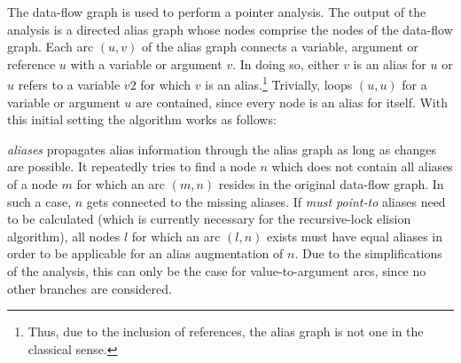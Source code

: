 The data-flow graph is used to perform a pointer analysis. The output of the analysis is a directed alias graph whose nodes comprise the nodes of the data-flow graph. Each arc $(u, v)$ of the alias graph connects a variable, argument or reference $u$ with a variable or argument $v$. In doing so, either $v$ is an alias for $u$ or $u$ refers to a variable $v2$ for which $v$ is an alias.\footnote{Thus, due to the inclusion of references, the alias graph is not one in the classical sense.} Trivially, loops $(u, u)$ for a variable or argument $u$ are contained, since every node is an alias for itself. With this initial setting the algorithm works as follows:

\vspace{4mm}

\textit{aliases} propagates alias information through the alias graph as long as changes are possible. It repeatedly tries to find a node $n$ which does not contain all aliases of a node $m$ for which an arc $(m, n)$ resides in the original data-flow graph. In such a case, $n$ gets connected to the missing aliases. If \textit{must point-to} aliases need to be calculated (which is currently necessary for the recursive-lock elision algorithm), all nodes $l$ for which an arc $(l, n)$ exists must have equal aliases in order to be applicable for an alias augmentation of $n$. Due to the simplifications of the analysis, this can only be the case for value-to-argument arcs, since no other branches are considered. 

